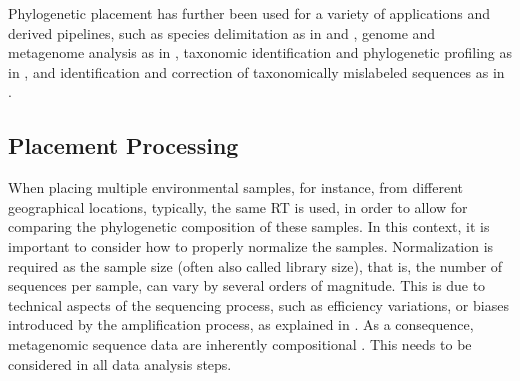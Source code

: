 Phylogenetic placement has further been used for a variety of applications and derived pipelines, such as
species delimitation as in  \cite{Zhang2013} and  \cite{Kapli2017},
genome and metagenome analysis as in  \cite{Darling2014},
taxonomic identification and phylogenetic profiling as in  \cite{Nguyen2014}, and
identification and correction of taxonomically mislabeled sequences as in  \cite{Kozlov2016}.



\subsection{Placement Processing}
\label{ch:Foundations:sec:PhylogeneticPlacement:sub:PlacementProcessing}


When placing multiple environmental samples, for instance, from different geographical locations,
typically, the same \ac{RT} is used, in order to allow for comparing the phylogenetic composition of these samples.
In this context, it is important to consider how to properly normalize the samples.
Normalization is required as the sample size (often also called library size),
that is, the number of sequences per sample, can vary by several orders of magnitude.
This is due to technical aspects of the sequencing process, such as efficiency variations,
or biases introduced by the amplification process,
as explained in .
As a consequence, metagenomic sequence data are inherently compositional \cite{Gloor2017}.
This needs to be considered in all data analysis steps.

